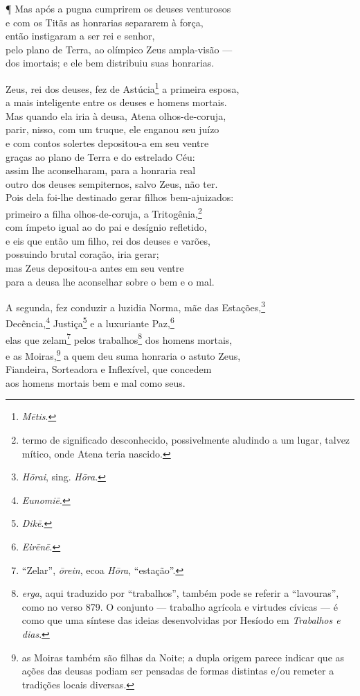 ¶ Mas após a pugna cumprirem os deuses venturosos\\
e com os Titãs as honrarias separarem à força,\\
então instigaram a ser rei e senhor,\\
pelo plano de Terra, ao olímpico Zeus ampla-visão ---\\
dos imortais; e ele bem distribuiu suas honrarias.

\quad{}Zeus, rei dos deuses, fez de Astúcia\footnote{\emph{Mētis}.} a primeira esposa,\\
a mais inteligente entre os deuses e homens mortais.\\
Mas quando ela iria à deusa, Atena olhos-de-coruja,\\
parir, nisso, com um truque, ele enganou seu juízo\\
e com contos solertes depositou-a em seu ventre \\
graças ao plano de Terra e do estrelado Céu:\\
assim lhe aconselharam, para a honraria real\\
outro dos deuses sempiternos, salvo Zeus, não ter.\\
Pois dela foi-lhe destinado gerar filhos bem-ajuizados:\\
primeiro a filha olhos-de-coruja, a Tritogênia,\footnote{termo de significado desconhecido, possivelmente aludindo a um lugar, talvez mítico, onde Atena teria nascido.} \\
com ímpeto igual ao do pai e desígnio refletido,\\
e eis que então um filho, rei dos deuses e varões,\\
possuindo brutal coração, iria gerar;\\
mas Zeus depositou-a antes em seu ventre\\
para a deusa lhe aconselhar sobre o bem e o mal. 

\quad{}A segunda, fez conduzir a luzidia Norma, mãe das Estações,\footnote{\emph{Hōrai}, sing. \emph{Hōra}.}\\
Decência,\footnote{\emph{Eunomiē}.} Justiça\footnote{\emph{Dikē}.} e a luxuriante Paz,\footnote{\emph{Eirēnē}.}\\
elas que zelam\footnote{``Zelar'', \emph{ōrein}, ecoa \emph{Hōra}, ``estação''.}
pelos trabalhos\footnote{\emph{erga}, aqui traduzido por ``trabalhos'', também pode se referir a ``lavouras'', como no verso 879. O conjunto --- trabalho agrícola e
virtudes cívicas --- é como que uma síntese das ideias desenvolvidas por
Hesíodo em \emph{Trabalhos e dias}.} dos homens mortais,\\
e as Moiras,\footnote{as Moiras também são filhas da Noite; a dupla origem parece indicar que as ações das deusas podiam ser pensadas de formas distintas e/ou
remeter a tradições locais diversas.} a quem deu suma honraria o astuto Zeus,\\
Fiandeira, Sorteadora e Inflexível, que concedem \\
aos homens mortais bem e mal como seus.

